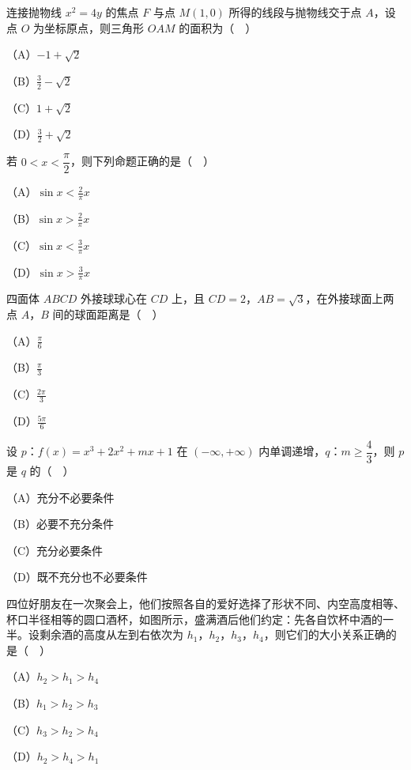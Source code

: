 \begin{question}
连接抛物线 $x^2=4y$ 的焦点 $F$ 与点 $M(1,0)$ 所得的线段与抛物线交于点 $A$，设点 $O$ 为坐标原点，则三角形 $OAM$ 的面积为（　）

（A）$-1+\sqrt2$

（B）$\frac32-\sqrt2$

（C）$1+\sqrt2$

（D）$\frac32+\sqrt2$

\end{question}
\begin{question}
若 $0<x<\dfrac{\pi}{2}$，则下列命题正确的是（　）

（A）$\sin x<\frac2\pi x$

（B）$\sin x>\frac2\pi x$

（C）$\sin x<\frac3\pi x$

（D）$\sin x>\frac3\pi x$

\end{question}
\begin{question}
四面体 $ABCD$ 外接球球心在 $CD$ 上，且 $CD=2$，$AB=\sqrt3$，在外接球面上两点 $A$，$B$ 间的球面距离是（　）

（A）$\frac{\pi}{6}$

（B）$\frac{\pi}{3}$

（C）$\frac{2\pi}{3}$

（D）$\frac{5\pi}{6}$

\end{question}
\begin{question}
设 $p$：$f(x)=x^3+2x^2+mx+1$ 在 $(-\infty,+\infty)$ 内单调递增，$q$：$m\geqslant\dfrac43$，则 $p$ 是 $q$ 的（　）

（A）充分不必要条件

（B）必要不充分条件

（C）充分必要条件

（D）既不充分也不必要条件

\Needspace{0.4\textheight}
\end{question}
\begin{question}
四位好朋友在一次聚会上，他们按照各自的爱好选择了形状不同、内空高度相等、杯口半径相等的圆口酒杯，如图所示，盛满酒后他们约定：先各自饮杯中酒的一半。设剩余酒的高度从左到右依次为 $h_1$，$h_2$，$h_3$，$h_4$，则它们的大小关系正确的是（　）
\nopagebreak[4]
\begin{center}\end{center}
\nopagebreak[4]
（A）$h_2>h_1>h_4$

（B）$h_1>h_2>h_3$

（C）$h_3>h_2>h_4$

（D）$h_2>h_4>h_1$

\end{question}
